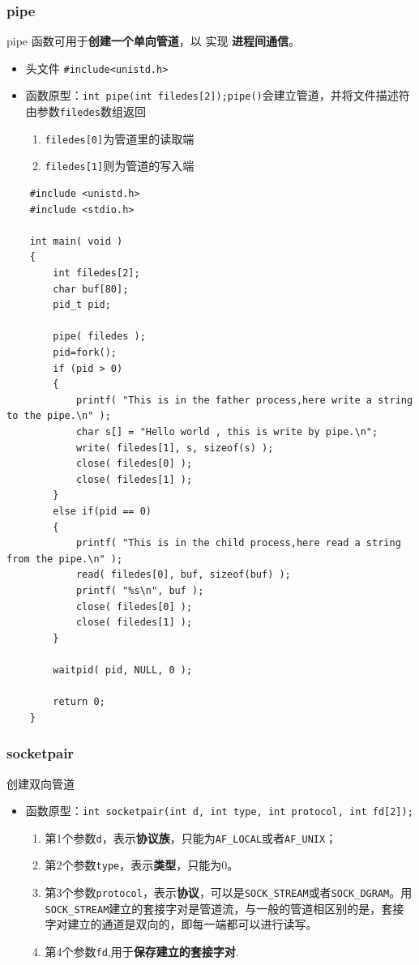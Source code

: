 \documentclass[UTF8,a4paper,12pt]{ctexbook}
\begin{document}
			\subsubsection{pipe}
				pipe 函数可用于\textbf{创建一个单向管道}，以 实现 \textbf{进程间通信}。
			
				\begin{itemize}
					\item 头文件 \verb|#include<unistd.h>|
					\item 函数原型：\verb|int pipe(int filedes[2]);|\verb|pipe()|会建立管道，并将文件描述符由参数\verb|filedes|数组返回
						\begin{enumerate}
							\item  \verb|filedes[0]|为管道里的读取端
							\item  \verb|filedes[1]|则为管道的写入端
						\end{enumerate}
				\end{itemize}
				
				\begin{lstlisting}
	#include <unistd.h>  
	#include <stdio.h>  
	
	int main( void )  
	{  
		int filedes[2];  
		char buf[80];  
		pid_t pid;  
		
		pipe( filedes );  
		pid=fork();          
		if (pid > 0)  
		{  
			printf( "This is in the father process,here write a string to the pipe.\n" );  
			char s[] = "Hello world , this is write by pipe.\n";  
			write( filedes[1], s, sizeof(s) );  
			close( filedes[0] );  
			close( filedes[1] );  
		}  
		else if(pid == 0)  
		{  
			printf( "This is in the child process,here read a string from the pipe.\n" );  
			read( filedes[0], buf, sizeof(buf) );  
			printf( "%s\n", buf );  
			close( filedes[0] );  
			close( filedes[1] );  
		}  
		
		waitpid( pid, NULL, 0 );  
		
		return 0;  
	}  
				\end{lstlisting}
			\subsubsection{socketpair}
				创建双向管道
				
				\begin{itemize}
					\item 函数原型：\verb|int socketpair(int d, int type, int protocol, int fd[2]);|   
						\begin{enumerate}
							\item 第1个参数\verb|d|，表示\textbf{协议族}，只能为\verb|AF_LOCAL|或者\verb|AF_UNIX|；
							\item 第2个参数\verb|type|，表示\textbf{类型}，只能为0。
							\item 第3个参数\verb|protocol|，表示\textbf{协议}，可以是\verb|SOCK_STREAM|或者\verb|SOCK_DGRAM|。用\verb|SOCK_STREAM|建立的套接字对是管道流，与一般的管道相区别的是，套接字对建立的通道是双向的，即每一端都可以进行读写。
							\item 第4个参数\verb|fd|,用于\textbf{保存建立的套接字对}.
						\end{enumerate}
				\end{itemize}
				
\end{document}
